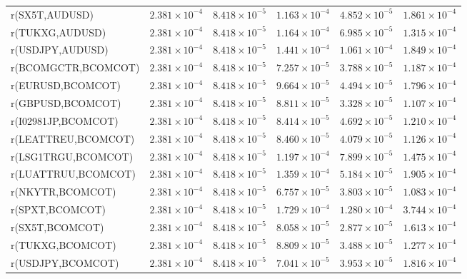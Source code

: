 \documentclass[10pt,a4paper]{article}
\begin{document}
\begin{tabular*}{\linewidth}{@{\extracolsep{\fill}}lrrrrr@{}}
r(SX5T,AUDUSD) & $2.381\times10^{-4}$ & $8.418\times10^{-5}$ & $1.163\times10^{-4}$ & $4.852\times10^{-5}$ & $1.861\times10^{-4}$ \\
r(TUKXG,AUDUSD) & $2.381\times10^{-4}$ & $8.418\times10^{-5}$ & $1.164\times10^{-4}$ & $6.985\times10^{-5}$ & $1.315\times10^{-4}$ \\
r(USDJPY,AUDUSD) & $2.381\times10^{-4}$ & $8.418\times10^{-5}$ & $1.441\times10^{-4}$ & $1.061\times10^{-4}$ & $1.849\times10^{-4}$ \\
r(BCOMGCTR,BCOMCOT) & $2.381\times10^{-4}$ & $8.418\times10^{-5}$ & $7.257\times10^{-5}$ & $3.788\times10^{-5}$ & $1.187\times10^{-4}$ \\
r(EURUSD,BCOMCOT) & $2.381\times10^{-4}$ & $8.418\times10^{-5}$ & $9.664\times10^{-5}$ & $4.494\times10^{-5}$ & $1.796\times10^{-4}$ \\
r(GBPUSD,BCOMCOT) & $2.381\times10^{-4}$ & $8.418\times10^{-5}$ & $8.811\times10^{-5}$ & $3.328\times10^{-5}$ & $1.107\times10^{-4}$ \\
r(I02981JP,BCOMCOT) & $2.381\times10^{-4}$ & $8.418\times10^{-5}$ & $8.414\times10^{-5}$ & $4.692\times10^{-5}$ & $1.210\times10^{-4}$ \\
r(LEATTREU,BCOMCOT) & $2.381\times10^{-4}$ & $8.418\times10^{-5}$ & $8.460\times10^{-5}$ & $4.079\times10^{-5}$ & $1.126\times10^{-4}$ \\
r(LSG1TRGU,BCOMCOT) & $2.381\times10^{-4}$ & $8.418\times10^{-5}$ & $1.197\times10^{-4}$ & $7.899\times10^{-5}$ & $1.475\times10^{-4}$ \\
r(LUATTRUU,BCOMCOT) & $2.381\times10^{-4}$ & $8.418\times10^{-5}$ & $1.359\times10^{-4}$ & $5.184\times10^{-5}$ & $1.905\times10^{-4}$ \\
r(NKYTR,BCOMCOT) & $2.381\times10^{-4}$ & $8.418\times10^{-5}$ & $6.757\times10^{-5}$ & $3.803\times10^{-5}$ & $1.083\times10^{-4}$ \\
r(SPXT,BCOMCOT) & $2.381\times10^{-4}$ & $8.418\times10^{-5}$ & $1.729\times10^{-4}$ & $1.280\times10^{-4}$ & $3.744\times10^{-4}$ \\
r(SX5T,BCOMCOT) & $2.381\times10^{-4}$ & $8.418\times10^{-5}$ & $8.058\times10^{-5}$ & $2.877\times10^{-5}$ & $1.613\times10^{-4}$ \\
r(TUKXG,BCOMCOT) & $2.381\times10^{-4}$ & $8.418\times10^{-5}$ & $8.809\times10^{-5}$ & $3.488\times10^{-5}$ & $1.277\times10^{-4}$ \\
r(USDJPY,BCOMCOT) & $2.381\times10^{-4}$ & $8.418\times10^{-5}$ & $7.041\times10^{-5}$ & $3.953\times10^{-5}$ & $1.816\times10^{-4}$ \\

\end{tabular*}
\end{document}
